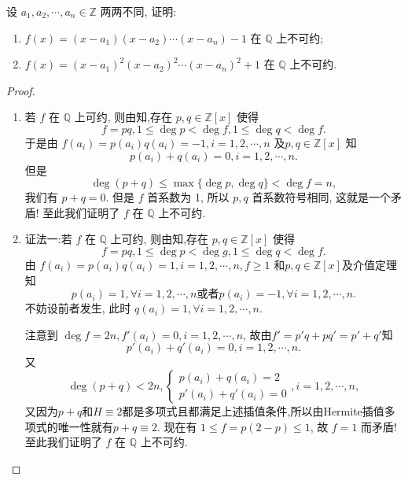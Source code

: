 \documentclass[../../main.tex]{subfiles}%
\begin{document}
\begin{example}
设 \( a_1,a_2,\cdots,a_n \in \mathbb{Z} \) 两两不同, 证明:
\begin{enumerate}
\item \( f(x) = (x - a_1)(x - a_2)\cdots(x - a_n) - 1 \) 在 \( \mathbb{Q} \) 上不可约;

\item \( f(x) = (x - a_1)^2(x - a_2)^2\cdots(x - a_n)^2 + 1 \) 在 \( \mathbb{Q} \) 上不可约.
\end{enumerate}
\end{example}
\begin{proof}
\begin{enumerate}
\item 若 \( f \) 在 \( \mathbb{Q} \) 上可约, 则由知,存在 \( p,q \in \mathbb{Z}[x] \) 使得
\[
f = pq, 1 \leqslant \deg p < \deg f, 1 \leqslant \deg q < \deg f.
\]
于是由 \( f(a_i) = p(a_i)q(a_i) = -1, i = 1,2,\cdots,n \) 及\( p,q \in \mathbb{Z}[x] \) 知
\[
p(a_i) + q(a_i) = 0, i = 1,2,\cdots,n.
\]
但是
\[
\deg(p + q) \leqslant \max\{\deg p, \deg q\} < \deg f = n,
\]
我们有 \( p + q = 0 \). 但是 \( f \) 首系数为 1, 所以 \( p,q \) 首系数符号相同, 这就是一个矛盾! 至此我们证明了 \( f \) 在 \( \mathbb{Q} \) 上不可约.

\item {\color{blue}证法一:}若 \( f \) 在 \( \mathbb{Q} \) 上可约, 则由知,存在 \( p,q \in \mathbb{Z}[x] \) 使得
\[
f = pq, 1 \leqslant \deg p < \deg g, 1 \leqslant \deg q < \deg f.
\]
由 \( f(a_i) = p(a_i)q(a_i) = 1, i = 1,2,\cdots,n, f \geqslant 1 \) 和\( p,q \in \mathbb{Z}[x] \)及介值定理知
\[
p(a_i) = 1, \forall i = 1,2,\cdots,n \text{或者} p(a_i) = -1, \forall i = 1,2,\cdots,n.
\]
不妨设前者发生, 此时 \( q(a_i) = 1, \forall i = 1,2,\cdots,n \).

注意到 \( \deg f = 2n, f'(a_i) = 0, i = 1,2,\cdots,n \), 故由$f'=p'q+pq'=p'+q'$知
\[p'(a_i) + q'(a_i) = 0, i = 1,2,\cdots,n .\] 又
\[
\deg(p + q) < 2n, \begin{cases} p(a_i) + q(a_i) = 2 \\ p'(a_i) + q'(a_i) = 0 \end{cases}, i = 1,2,\cdots,n,
\]
又因为$p+q$和$H\equiv 2$都是多项式且都满足上述插值条件,所以由Hermite插值多项式的唯一性就有\( p + q \equiv 2 \). 现在有 \( 1 \leqslant f = p(2 - p) \leqslant 1 \), 故 \( f = 1 \) 而矛盾! 至此我们证明了 \( f \) 在 \( \mathbb{Q} \) 上不可约.


\end{enumerate}
\end{proof}
\end{document}
